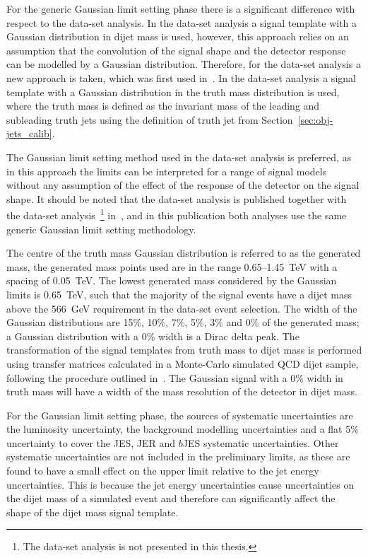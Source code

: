 \clearpage

For the generic Gaussian limit setting phase there is a significant difference with respect to the \summer{} data-set analysis.
In the \summer{} data-set analysis a signal template with a Gaussian distribution in dijet mass is used,
however, this approach relies on an assumption that the convolution of the signal shape and the detector response can be modelled by a Gaussian distribution.
Therefore, for the \lm{} data-set analysis a new approach is taken, which was first used in~\cite{dijet-mori17_paper}.
In the \lm{} data-set analysis a signal template with a Gaussian distribution in the truth mass distribution is used,
where the truth mass is defined as the invariant mass of the leading and subleading truth jets using the definition of truth jet from Section~\ref{sec:obj-jets_calib}.

The Gaussian limit setting method used in the \lm{} data-set analysis is preferred,
as in this approach the limits can be interpreted for a range of signal models without
any assumption of the effect of the response of the detector on the signal shape.
It should be noted that the \lm{} data-set analysis is published
together with the \hm{} data-set analysis~\footnote{ The \hm{} data-set analysis is not presented in this thesis.}
in~\cite{dibjet-full_paper}, and in this publication both analyses use the same generic Gaussian limit setting methodology.

The centre of the truth mass Gaussian distribution is referred to as the generated mass,
the generated mass points used are in the range 0.65--1.45~TeV with a spacing of 0.05~TeV.
The lowest generated mass considered by the Gaussian limits is 0.65~TeV,
such that the majority of the signal events have a dijet mass above the 566~GeV requirement in the \lm{} data-set event selection.
The width of the Gaussian distributions are 15\%, 10\%, 7\%, 5\%, 3\% and 0\% of the generated mass;
a Gaussian distribution with a 0\% width is a Dirac delta peak.
The transformation of the signal templates from truth mass to dijet mass is performed using
transfer matrices calculated in a Monte-Carlo simulated QCD dijet sample,
following the procedure outlined in~\cite{dijet-mori17_paper}.
The Gaussian signal with a 0\% width in truth mass will have
a width of the mass resolution of the detector in dijet mass.

For the Gaussian limit setting phase, the sources of systematic uncertainties
are the luminosity uncertainty,
the background modelling uncertainties and a flat 5\% uncertainty to cover
the JES, JER and $b$JES systematic uncertainties.
Other systematic uncertainties are not included in the preliminary limits,
as these are found to have a small effect on the upper limit relative to the jet energy uncertainties.
This is because the jet energy uncertainties cause uncertainties on the dijet mass of a simulated event and
therefore can significantly affect the shape of the dijet mass signal template.

